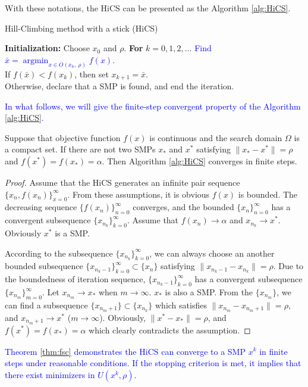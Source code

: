 \documentclass[mathpazo]{csam}
\DeclareMathOperator*{\argmin}{\mathrm{argmin}}
\theoremstyle{remark}
\begin{document}
With these notations, the HiCS can be presented
as the Algorithm \ref{alg:HiCS}.
\begin{algorithm}[H]
	\caption{Hill-Climbing method with a stick (HiCS)}
	\label{alg:HiCS}
\begin{algorithmic}[1]
	\STATE \textbf{Initialization:} Choose $x_0$ and $\rho$.
	\STATE \textbf{For} $k=0,1,2,\dots$
	\STATE \hspace{0.5cm} 
	\textcolor{blue}{Find $\bar{x}=\argmin_{x\in O(x_k,~ \rho)} f(x)$. }
			\\
	\STATE \hspace{0.5cm} If $f(\bar x)<f(x_k)$, then set $x_{k+1}= \bar{x}$.
		  \\
	\STATE \hspace{0.5cm} Otherwise, declare that 
		   a SMP is found, and end the iteration.
\end{algorithmic}
\end{algorithm}
\textcolor{blue}{ 
In what follows, we will give the finite-step convergent property of the Algorithm
\ref{alg:HiCS}.
}
\begin{theorem}
	\label{thm:fsc}
	Suppose that objective function $f(x)$ is continuous and the
	search domain $\Omega$ is a compact set.
	If there are not two SMPs $x_*$ and $x^*$ satisfying 
	$\|x_*-x^*\|=\rho$ and $f(x^*)=f(x_*)=\alpha$.
	Then Algorithm \ref{alg:HiCS} converges in finite steps.
\end{theorem}
\begin{proof}
	Assume that the HiCS generates an infinite pair sequence
	$\{x_n, f(x_n)\}_{x=0}^{\infty}$. From these assumptions,
	it is obvious $f(x)$ is bounded. The decreasing sequence
	$\{f(x_n)\}_{n=0}^\infty$ converges, and the bounded
	$\{x_n\}_{n=0}^\infty$ has a convergent subsequence 
	$\{x_{n_k}\}_{k=0}^\infty$. Assume that $f(x_n)\rightarrow
	\alpha$ and $x_{n_k}\rightarrow x^*$. Obviously $x^*$ is a SMP.
	
	According to the subsequence
	$\{x_{n_k}\}_{k=0}^\infty$, we can always choose an another
	bounded subsequence $\{x_{n_k -1}\}_{k=0}^\infty \subset
	\{x_n\}$ satisfying $\|x_{n_k - 1}-x_{n_k}\|=\rho$. 
	Due to the boundedness of iteration
	sequence, $\{x_{n_k-1}\}_{k=0}^\infty$ has a convergent
	subsequence $\{x_{n_{m}}\}_{m=0}^\infty$. Let $x_{n_m}
	\rightarrow x_*$ when $m\rightarrow \infty$. $x_*$ is also a SMP.
	From the $\{x_{n_m}\}$, we can find a subsequence
	$\{x_{n_{m}+1}\}\subset \{x_{n_k}\}$ which satisfies
	$\|x_{n_m}-x_{n_{m}+1}\|=\rho$, and $x_{n_{m}+1}\rightarrow x^*$
	($m\rightarrow \infty$).
	Obviously, $\|x^*-x_*\|=\rho$, and $f(x^*)=f(x_*)=\alpha$ 
	which clearly contradicts the assumption.
\end{proof}
\textcolor{blue}{ 
Theorem \ref{thm:fsc} demonstrates the HiCS can converge to a SMP $x^k$ in finite
steps under reasonable conditions. If the stopping criterion is met, it implies
that there exist minimizers in $U(x^k, \rho)$. 
}
\end{document}
